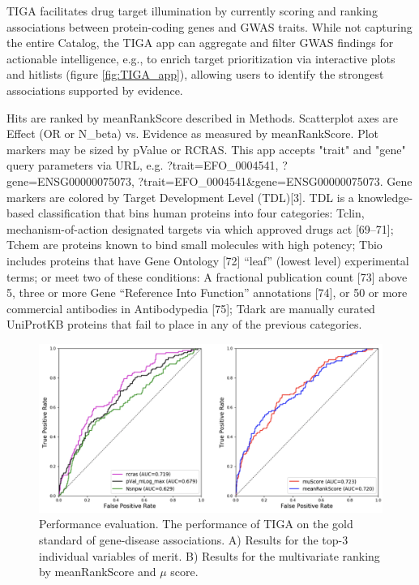 TIGA facilitates drug target illumination by currently scoring and ranking associations between protein-coding genes and GWAS traits. While not capturing the entire Catalog, the TIGA app can aggregate and filter GWAS findings for actionable intelligence, e.g., to enrich target prioritization via interactive plots and hitlists (figure \ref{fig:TIGA_app}), allowing users to identify the strongest associations supported by evidence.

Hits are ranked by meanRankScore described in Methods. Scatterplot axes are Effect (OR or N\_beta) vs. Evidence as measured by meanRankScore. Plot markers may be sized by pValue or RCRAS. This app accepts "trait" and "gene" query parameters via URL, e.g. ?trait=EFO\_0004541, ?gene=ENSG00000075073, ?trait=EFO\_0004541\&gene=ENSG00000075073.  Gene markers are colored by Target Development Level (TDL)[3]. TDL is a knowledge-based classification that bins human proteins into four categories: Tclin, mechanism-of-action designated targets via which approved drugs act [69–71]; Tchem are proteins known to bind small molecules with high potency; Tbio includes proteins that have Gene Ontology [72] “leaf” (lowest level) experimental terms; or meet two of these conditions:  A fractional publication count [73] above 5, three or more Gene “Reference Into Function” annotations [74], or 50 or more commercial antibodies in Antibodypedia [75]; Tdark are manually curated UniProtKB proteins that fail to place in any of the previous categories.

\begin{figure}
	\includegraphics[width=\textwidth]{figures/tiga/FIG04_ROCs.png}
	\caption{Performance evaluation. The performance of TIGA on the gold standard of gene-disease associations. A) Results for the top-3 individual variables of merit. B) Results for the multivariate ranking by meanRankScore and $\mu$ score.}
	\label{fig:TIGA_rocs}
\end{figure}

